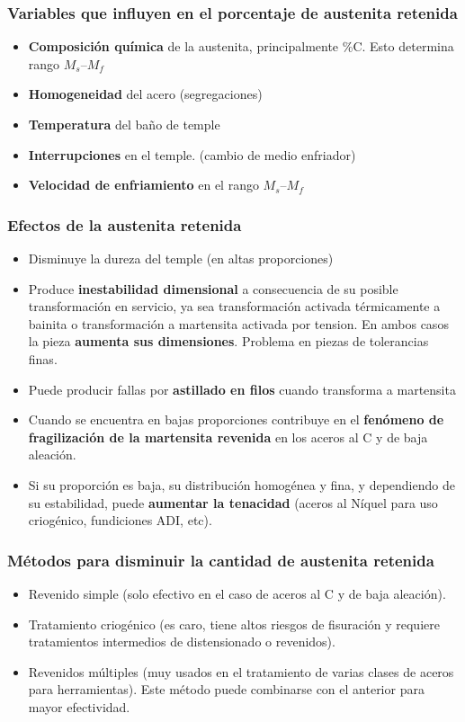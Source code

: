 \subsubsection{Variables que influyen en el porcentaje de austenita retenida}
\begin{itemize}
    \item \textbf{Composición química} de la austenita, principalmente \%C. Esto determina rango $M_s$--$M_f$
    \item \textbf{Homogeneidad} del acero (segregaciones)
    \item \textbf{Temperatura} del baño de temple
    \item \textbf{Interrupciones} en el temple. (cambio de medio enfriador)
    \item \textbf{Velocidad de enfriamiento} en el rango $M_s$--$M_f$
\end{itemize}

\subsubsection{Efectos de la austenita retenida}
\begin{itemize}
    \item Disminuye la dureza del temple (en altas proporciones)
    \item Produce \textbf{inestabilidad dimensional} a consecuencia de su posible transformación en servicio, ya sea transformación activada térmicamente a bainita o transformación a martensita activada por tension. En ambos casos la pieza \textbf{aumenta sus dimensiones}. Problema en piezas de tolerancias finas.
    \item Puede producir fallas por \textbf{astillado en filos} cuando transforma a martensita
    \item Cuando se encuentra en bajas proporciones contribuye en el \textbf{fenómeno de fragilización de la martensita revenida} en los aceros al C y de baja aleación.
    \item Si su proporción es baja, su distribución homogénea y fina, y dependiendo de su estabilidad, puede \textbf{aumentar la tenacidad} (aceros al Níquel para uso criogénico, fundiciones ADI, etc).
\end{itemize}

\subsubsection{Métodos para disminuir la cantidad de austenita retenida}
\begin{itemize}
    \item Revenido simple (solo efectivo en el caso de aceros al C y de baja aleación).
    \item Tratamiento criogénico (es caro, tiene altos riesgos de fisuración y requiere tratamientos intermedios de distensionado o revenidos).
    \item Revenidos múltiples (muy usados en el tratamiento de varias clases de aceros para herramientas). Este método puede combinarse con el anterior para mayor efectividad.
\end{itemize}


